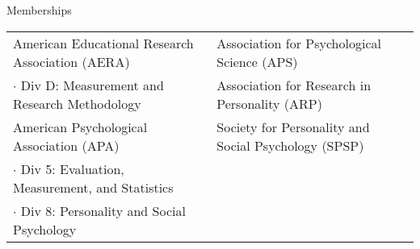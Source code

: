 \documentclass {resume}
\begin{document}
\begin{samepage}\begin{rSection}{\textrm{Memberships}}
\begin{tabular}{ l l }
American Educational Research Association (AERA)& Association for Psychological Science (APS) \\
$\cdot$ {\small Div D: Measurement and Research Methodology} &  Association for Research in Personality (ARP)\\
American Psychological Association (APA) & Society for Personality and Social Psychology (SPSP)\\
$\cdot$ {\small Div 5: Evaluation, Measurement, and Statistics}
\\
$\cdot$ {\small Div 8: Personality and Social Psychology} \\
\end{tabular}
\end{rSection}\end{samepage}
\end{document}
